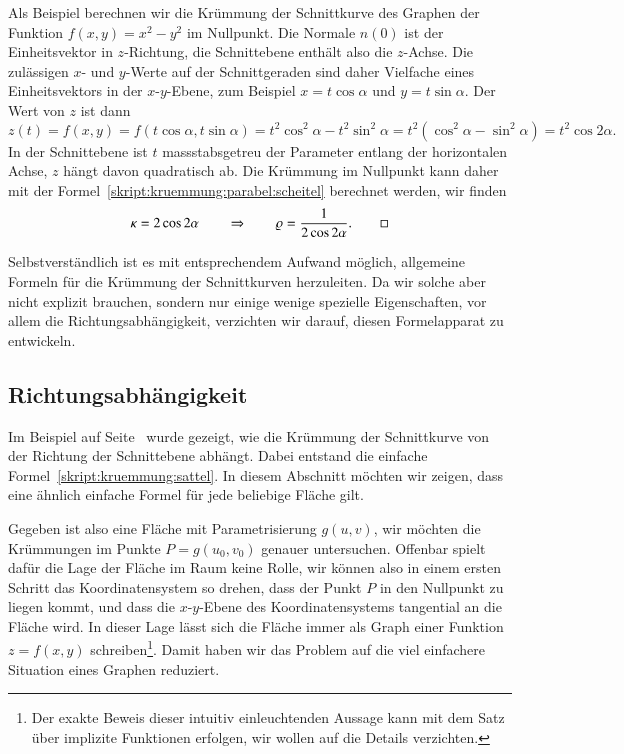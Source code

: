 \begin{beispiel}
\label{skript:sattelbeispiel}
Als Beispiel berechnen wir die Krümmung der Schnittkurve des Graphen
der Funktion
$f(x,y) = x^2-y^2$ im Nullpunkt.
Die Normale $n(0)$ ist der Einheitsvektor in $z$-Richtung, die Schnitt\-ebene
enthält also die $z$-Achse.
Die zulässigen $x$- und $y$-Werte auf der Schnittgeraden sind daher Vielfache
eines Einheitsvektors in der $x$-$y$-Ebene, zum Beispiel $x=t\cos\alpha$
und $y=t\sin\alpha$.
Der Wert von $z$ ist dann
\[
z(t)
=
f(x,y)
=
f(t\cos\alpha,t\sin\alpha)
=
t^2\cos^2\alpha - t^2\sin^2\alpha
=
t^2(\cos^2\alpha - \sin^2\alpha)
=
t^2\cos 2\alpha.
\]
In der Schnittebene ist $t$ massstabsgetreu der Parameter entlang der
horizontalen Achse, $z$ hängt davon quadratisch ab.
Die Krümmung im Nullpunkt kann daher mit der
Formel~\eqref{skript:kruemmung:parabel:scheitel}
berechnet werden,
wir finden
\begin{equation}
\kappa = 2\cos2\alpha
\qquad\Rightarrow\qquad
\varrho = \frac1{2\cos2\alpha}.
\label{skript:kruemmung:sattel}
\qedhere
\end{equation}
\end{beispiel}

Selbstverständlich ist es mit entsprechendem Aufwand möglich, allgemeine
Formeln für die Krümmung der Schnittkurven herzuleiten.
Da wir solche aber nicht explizit brauchen, sondern nur einige wenige
spezielle Eigenschaften, vor allem die Richtungsabhängigkeit, verzichten
wir darauf, diesen Formelapparat zu entwickeln.

\subsection{Richtungsabhängigkeit%
\label{skript:kruemmung:richtungsabhaengigkeit}}
Im Beispiel auf Seite~\pageref{skript:sattelbeispiel} wurde gezeigt, wie
die Krümmung der Schnittkurve von der Richtung der Schnittebene
abhängt.
Dabei entstand die einfache Formel~\eqref{skript:kruemmung:sattel}.
In diesem Abschnitt möchten wir zeigen, dass eine ähnlich einfache
Formel für jede beliebige Fläche gilt.

Gegeben ist also eine Fläche mit Parametrisierung $g(u,v)$, wir möchten
die Krümmungen im Punkte $P=g(u_0,v_0)$ genauer untersuchen.
Offenbar spielt dafür die Lage der Fläche im Raum keine Rolle, wir können
also in einem ersten Schritt das Koordinatensystem so drehen, dass der
Punkt $P$ in den Nullpunkt zu liegen kommt, und dass die $x$-$y$-Ebene des
Koordinatensystems tangential an die Fläche wird.
In dieser Lage lässt sich die Fläche immer als Graph einer Funktion
$z=f(x,y)$ schreiben\footnote{%
Der exakte Beweis dieser intuitiv einleuchtenden Aussage kann mit
dem Satz über implizite Funktionen erfolgen, wir wollen auf die Details
verzichten.}.
Damit haben wir das Problem auf die viel einfachere Situation eines
Graphen reduziert.


